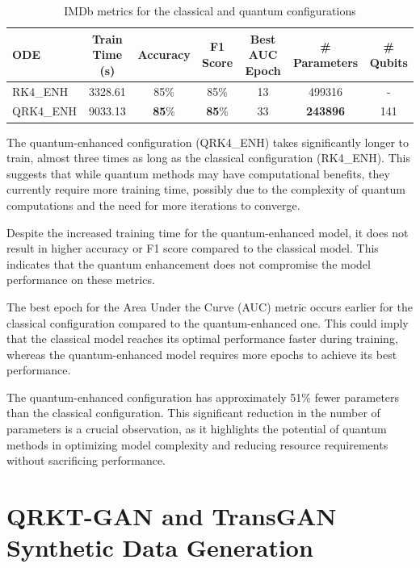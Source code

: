 \documentclass[12pt,a4paper]{report}
\begin{document}
\begin{table}[th]\small\linespread{1}
  \label{tab:classical_CIFAR_1}
  \centering
  \begin{tabular}{|l|c|c|c|c|c|c|}
    \hline
    \textbf{ODE} & \textbf{Train Time (s)} & \textbf{Accuracy} & \textbf{F1 Score} & \textbf{Best AUC Epoch} & \textbf{\# Parameters} & \textbf{\# Qubits} \\
    \hline
    RK4\_ENH     & 3328.61                 & 85\%              & 85\%              & 13                      & 499316                 & -                  \\
    QRK4\_ENH    & 9033.13                 & \textbf{85}\%     & \textbf{85}\%     & 33                      & \textbf{243896}        & 141                \\
    \hline
  \end{tabular}
  \caption{IMDb metrics for the classical and quantum configurations}
\end{table}

The quantum-enhanced configuration (QRK4\_ENH) takes significantly longer to train, almost three times as long as the classical configuration (RK4\_ENH). This suggests that while quantum methods may have computational benefits, they currently require more training time, possibly due to the complexity of quantum computations and the need for more iterations to converge.

Despite the increased training time for the quantum-enhanced model, it does not result in higher accuracy or F1 score compared to the classical model. This indicates that the quantum enhancement does not compromise the model performance on these metrics.

The best epoch for the Area Under the Curve (AUC) metric occurs earlier for the classical configuration compared to the quantum-enhanced one. This could imply that the classical model reaches its optimal performance faster during training, whereas the quantum-enhanced model requires more epochs to achieve its best performance.

The quantum-enhanced configuration has approximately 51\% fewer parameters than the classical configuration. This significant reduction in the number of parameters is a crucial observation, as it highlights the potential of quantum methods in optimizing model complexity and reducing resource requirements without sacrificing performance.

\clearpage

\section{QRKT-GAN and TransGAN Synthetic Data Generation}
\end{document}
